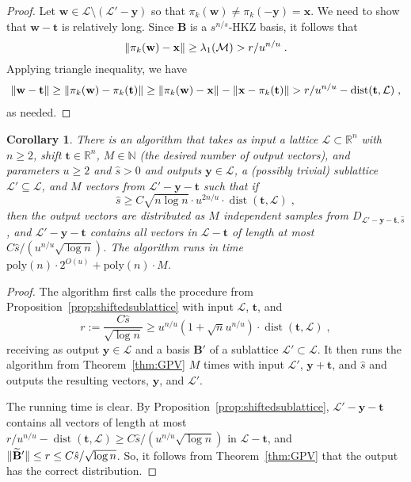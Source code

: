 \documentclass[11pt]{article}
\newtheorem{corollary}[theorem]{Corollary}
\newcommand{\N}{\ensuremath{\mathbb{N}}}
\newcommand{\R}{\ensuremath{\mathbb{R}}}
\renewcommand{\vec}[1]{\ensuremath{\mathbf{#1}}}
\newcommand{\basis}{\ensuremath{\mathbf{B}}}
\newcommand{\poly}{\mathrm{poly}}
\newcommand{\M}{\mathcal{M}}
\newcommand{\lat}{\mathcal{L}}
\newcommand{\gs}[1]{\ensuremath{\widetilde{#1}}}
\DeclareMathOperator{\dist}{dist}
\DeclarePairedDelimiter\length{\lVert}{\rVert}
\begin{document}
\begin{proof}
Let $\vec{w} \in \lat \setminus (\lat' - \vec{y})$ so that $\pi_k(\vec{w}) \neq \pi_k(-\vec{y}) = \vec{x}$. We need to show that $\vec{w} - \vec{t}$ is relatively long. Since $\basis$ is a $s^{n/s}$-HKZ basis, it follows that
\[
\length{\pi_k(\vec{w}) - \vec{x}} \geq \lambda_1(\M) > r/u^{n/u}
\; .
\]
Applying triangle inequality, we have
\begin{align*}
\length{\vec{w} - \vec{t}} \geq \length{\pi_k(\vec{w}) - \pi_k(\vec{t})}
\geq \length{\pi_k(\vec{w}) - \vec{x}} - \length{ \vec{x} - \pi_k(\vec{t})}
> r/u^{n/u}- \dist(\vec{t}, \lat)
\; ,
\end{align*}
as needed.
 \end{proof}



 
 \begin{corollary}
 \label{cor:start}
 There is an algorithm that takes as input a lattice $\lat \subset \R^n$ with $n \geq 2$, shift $\vec{t} \in \R^n$, $M \in \N$ (the desired number of output vectors), and parameters $u \geq 2$ and 
$\hat{s} > 0$
and outputs $\vec{y} \in \lat$, a (possibly trivial) sublattice $\lat' \subseteq \lat$, and $M$ vectors from $\lat' - \vec{y} - \vec{t}$ such that
if 
\[
\hat{s} \geq C\sqrt{n \log n} \cdot u^{2n/u} \cdot \dist(\vec{t}, \lat)
\; ,
\]
then the output vectors are distributed as $M$ independent samples from $D_{\lat' - \vec{y} - \vec{t}, \hat{s}}$, and $\lat' - \vec{y} - \vec{t}$ contains all vectors in $\lat - \vec{t}$ of length at most $C\hat{s}/(u^{n/u}\sqrt{\log n})$. The algorithm runs in time $\poly(n) \cdot 2^{O(u)} + \poly(n) \cdot M $.
\end{corollary}
\begin{proof}
 The algorithm first calls the procedure from Proposition~\ref{prop:shiftedsublattice} with input $\lat$, $\vec{t}$, and 
\[
r := \frac{C\hat{s}}{\sqrt{\log n}} \geq u^{n/u} (1+\sqrt{n} u^{n/u}) \cdot \dist(\vec{t}, \lat)
\; ,
\] receiving as output $\vec{y} \in \lat$ and a basis $\basis'$ of a sublattice $\lat' \subset \lat $. It then runs the algorithm from Theorem~\ref{thm:GPV} $M$ times with input $\lat'$, $\vec{y} + \vec{t}$, and $\hat{s}$ and outputs the resulting vectors, $\vec{y}$, and $\lat'$.

The running time is clear. By Proposition~\ref{prop:shiftedsublattice}, $\lat' - \vec{y} - \vec{t}$ contains all vectors of length at most $r/u^{n/u} - \dist(\vec{t}, \lat) \geq  C\hat{s}/(u^{n/u}\sqrt{\log n})$ in $\lat - \vec{t}$, and $\length{\gs{\basis}'} \leq r \leq C \hat{s}/\sqrt{ \log n} $. So, it follows from Theorem~\ref{thm:GPV} that the output has the correct distribution.
\end{proof}
\end{document}
